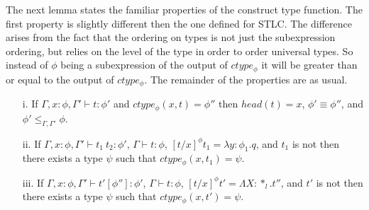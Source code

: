 \noindent The next lemma states the familiar properties of the
construct type function.  The first property is slightly different
then the one defined for STLC.  The difference arises from the fact
that the ordering on types is not just the subexpression ordering, but
relies on the level of the type in order to order universal types.  So
instead of $\phi$ being a subexpression of the output of $ctype_\phi$
it will be greater than or equal to the output of $ctype_\phi$.  The
remainder of the properties are as usual.

\begin{lemma}
  \label{lemma:ctype_props_ssf}
  \begin{itemize}
  \item[]
  \item[i.] If $\Gamma,x:\phi,\Gamma' \vdash t:\phi'$ and $ctype_\phi(x,t) = \phi''$ then 
    $head(t) = x$, $\phi' \equiv \phi''$, and $\phi' \leq_{\Gamma,\Gamma'} \phi$.

  \item[ii.] If $\Gamma,x:\phi,\Gamma' \vdash t_1\ t_2:\phi'$, $\Gamma \vdash t:\phi$,
    $[t/x]^\phi t_1 = \lambda y:\phi_1.q$, and $t_1$ is not then there exists a type
    $\psi$ such that $ctype_\phi(x,t_1) = \psi$.

  \item[iii.] If $\Gamma,x:\phi,\Gamma' \vdash t'[\phi'']:\phi'$, $\Gamma \vdash t:\phi$,
    $[t/x]^\phi t' = \Lambda X:*_l.t''$, and $t'$ is not then there exists a type
    $\psi$ such that $ctype_\phi(x,t') = \psi$.
  \end{itemize}
\end{lemma}

